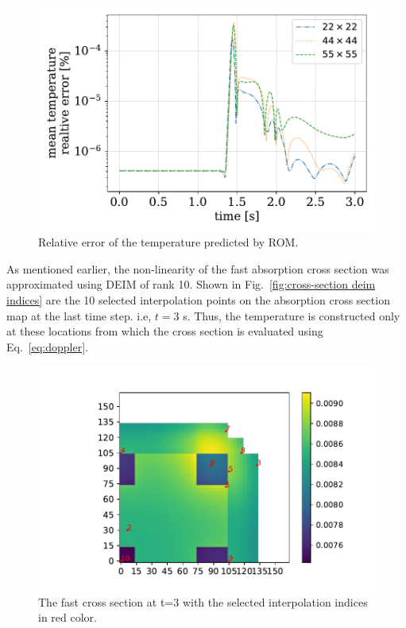 \documentclass[]{interact}
\theoremstyle{plain}%
\theoremstyle{definition}
\theoremstyle{remark}
\begin{document}
\begin{figure}[H]
	\includegraphics[width=1.0\linewidth]{../figures/temperature_relative_error.pdf}
	\caption{Relative error of the temperature predicted by ROM.}
	\label{fig:deim tempearture error}
\end{figure}

As mentioned earlier, the non-linearity of the fast absorption cross section was approximated using DEIM of rank 10.
Shown in Fig.~\ref{fig:cross-section deim indices} are the 10 selected interpolation points on the absorption cross section map at the last time step. i.e, $t=3$ s.
Thus, the temperature is constructed only at these locations from which the cross section is evaluated using Eq.~\ref{eq:doppler}.

\begin{figure}[H]
	\includegraphics[width=1.0\linewidth]{../figures/LRA_XS_interpolation_points_XS_map.pdf}
	\caption{The fast cross section at t=3 with the selected interpolation indices in red color.}
	\label{fig:cross section deim indices}
\end{figure} 
\end{document}
